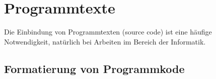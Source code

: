 


\section{Programmtexte}
\label{sec:programmtexte}

Die Einbindung von Programmtexten (source code) ist eine häufige Notwendigkeit,
\va natürlich bei Arbeiten im Bereich der Informatik.

\subsection{Formatierung von Programmkode}
\label{sec:FormatierungVonProgrammkode}

